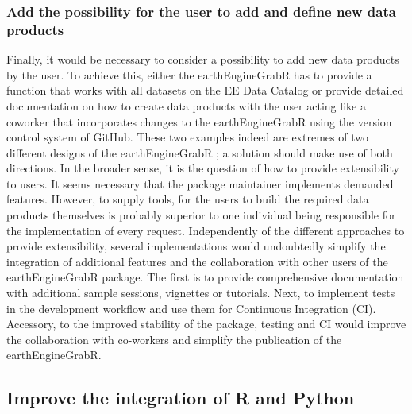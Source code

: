 \subsubsection{Add the possibility for the user to add and define new data products}

Finally, it would be necessary to consider a possibility to add new data products by the user. To achieve this, either the earthEngineGrabR has to provide a function that works with all datasets on the EE Data Catalog or provide detailed documentation on how to create data products with the user acting like a coworker that incorporates changes to the earthEngineGrabR using the version control system of GitHub. These two examples indeed are extremes of two different designs of the earthEngineGrabR ; a solution should make use of both directions. In the broader sense, it is the question of how to provide extensibility to users. It seems necessary that the package maintainer implements demanded features. However, to supply tools, for the users to build the required data products themselves is probably superior to one individual being responsible for the implementation of every request.
Independently of the different approaches to provide extensibility, several implementations would undoubtedly simplify the integration of additional features and the collaboration with other users of the earthEngineGrabR package. The first is to provide comprehensive documentation with additional sample sessions, vignettes or tutorials. Next, to implement tests in the development workflow and use them for Continuous Integration (CI). Accessory, to the improved stability of the package, testing and CI would improve the collaboration with co-workers and simplify the publication of the earthEngineGrabR. 

\subsection{Improve the integration of R and Python}

